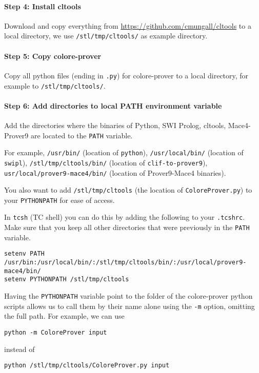 \documentclass{article}
\begin{document}
\paragraph{Step 4: Install cltools}

Download and copy everything from \url{https://github.com/cmungall/cltools} to a local directory, we use \texttt{/stl/tmp/cltools/} as example directory.

\paragraph{Step 5: Copy colore-prover}
Copy all python files (ending in \texttt{.py}) for colore-prover to a local directory, for example to \texttt{/stl/tmp/cltools/}.

\paragraph{Step 6: Add directories to local PATH environment variable}

Add the directories where the binaries of Python, SWI Prolog, cltools, Mace4-Prover9 are located to the \texttt{PATH} variable.
 
For example, \texttt{/usr/bin/} (location of \texttt{python}), \texttt{/usr/local/bin/} (location of \texttt{swipl}), \texttt{/stl/tmp/cltools/bin/} (location of \texttt{clif-to-prover9}), \texttt{usr/local/prover9-mace4/bin/} (location of Prover9-Mace4 binaries).

You also want to add \texttt{/stl/tmp/cltools} (the location of \texttt{ColoreProver.py}) to your \texttt{PYTHONPATH} for ease of access. 

In \texttt{tcsh} (TC shell) you can do this by adding the following to your \texttt{.tcshrc}.  Make sure that you keep all other directories that were previously in the \texttt{PATH} variable.
\begin{verbatim}
setenv PATH /usr/bin:/usr/local/bin/:/stl/tmp/cltools/bin/:/usr/local/prover9-mace4/bin/
setenv PYTHONPATH /stl/tmp/cltools
\end{verbatim}

Having the \texttt{PYTHONPATH} variable point to the folder of the colore-prover python scripts allows us to call them by their name alone using the \texttt{-m} option, omitting the full path. For example, we can use
\begin{verbatim}
python -m ColoreProver input
\end{verbatim}
instead of
\begin{verbatim}
python /stl/tmp/cltools/ColoreProver.py input
\end{verbatim}
\end{document}
